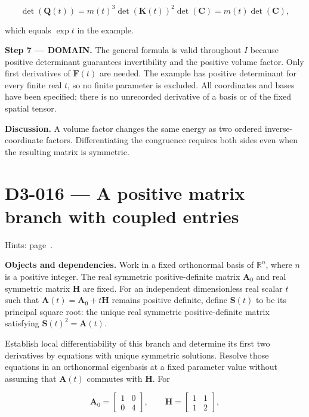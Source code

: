 \documentclass[11pt,oneside,openany]{book}
\begin{document}
\[
\det(\mathbf Q(t))=m(t)^3\det(\mathbf K(t))^2\det(\mathbf C)
=m(t)\det(\mathbf C),
\]

which equals \(\exp t\) in the example.

\begin{DomainStep}
\textbf{Step 7 --- DOMAIN.} The general formula is valid throughout \(I\) because positive determinant guarantees invertibility and the positive volume factor. Only first derivatives of \(\mathbf F(t)\) are needed. The example has positive determinant for every finite real \(t\), so no finite parameter is excluded. All coordinates and bases have been specified; there is no unrecorded derivative of a basis or of the fixed spatial tensor.

\end{DomainStep}
\textbf{Discussion.} A volume factor changes the same energy as two ordered inverse-coordinate factors. Differentiating the congruence requires both sides even when the resulting matrix is symmetric.
\clearpage
\section{D3-016 --- A positive matrix branch with coupled entries}
\label{problem:D3-016}
{\small Hints: page~\pageref{hints:D3-016}.}\par\medskip

\textbf{Objects and dependencies.} Work in a fixed orthonormal basis of \(\mathbb R^n\), where \(n\) is a positive integer. The real symmetric positive-definite matrix \(\mathbf A_0\) and real symmetric matrix \(\mathbf H\) are fixed. For an independent dimensionless real scalar \(t\) such that \(\mathbf A(t)=\mathbf A_0+t\mathbf H\) remains positive definite, define \(\mathbf S(t)\) to be its principal square root: the unique real symmetric positive-definite matrix satisfying \(\mathbf S(t)^2=\mathbf A(t)\).

Establish local differentiability of this branch and determine its first two derivatives by equations with unique symmetric solutions. Resolve those equations in an orthonormal eigenbasis at a fixed parameter value without assuming that \(\mathbf A(t)\) commutes with \(\mathbf H\). For

\[
\mathbf A_0=\begin{bmatrix}1&0\\0&4\end{bmatrix},\qquad
\mathbf H=\begin{bmatrix}1&1\\1&2\end{bmatrix},
\]
\end{document}
